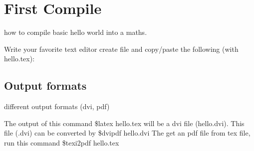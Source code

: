 \styledchapter

\section{First Compile}

how to compile basic hello world into a \gls{maths}.

Write your favorite text editor create file and copy/paste the following (with hello.tex):

\subsection{Output formats}

different output formats (dvi, pdf)

The output of this command \$latex hello.tex will be a dvi 
file (hello.dvi). This file (.dvi) can be converted by \$dvipdf 
hello.dvi The get an pdf file from tex file, run this 
command \$texi2pdf hello.tex